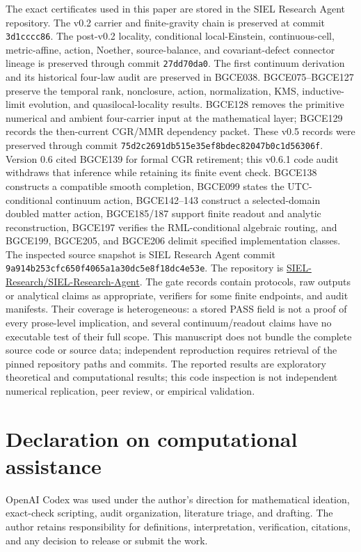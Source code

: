 \documentclass[11pt]{article}
\theoremstyle{definition}
\theoremstyle{remark}
\begin{document}
The exact certificates used in this paper are stored in the SIEL Research Agent repository. The v0.2 carrier and finite-gravity chain is preserved at commit \texttt{3d1cccc86}. The post-v0.2 locality, conditional local-Einstein, continuous-cell, metric-affine, action, Noether, source-balance, and covariant-defect connector lineage is preserved through commit \texttt{27dd70da0}. The first continuum derivation and its historical four-law audit are preserved in BGCE038. BGCE075--BGCE127 preserve the temporal rank, nonclosure, action, normalization, KMS, inductive-limit evolution, and quasilocal-locality results. BGCE128 removes the primitive numerical and ambient four-carrier input at the mathematical layer; BGCE129 records the then-current CGR/MMR dependency packet. These v0.5 records were preserved through commit \texttt{75d2c2691db515e35ef8bdec82047b0c1d56306f}. Version 0.6 cited BGCE139 for formal CGR retirement; this v0.6.1 code audit withdraws that inference while retaining its finite event check. BGCE138 constructs a compatible smooth completion, BGCE099 states the UTC-conditional continuum action, BGCE142--143 construct a selected-domain doubled matter action, BGCE185/187 support finite readout and analytic reconstruction, BGCE197 verifies the RML-conditional algebraic routing, and BGCE199, BGCE205, and BGCE206 delimit specified implementation classes. The inspected source snapshot is SIEL Research Agent commit \texttt{9a914b253cfc650f4065a1a30dc5e8f18dc4e53e}. The repository is
\href{https://github.com/SIEL-Research/SIEL-Research-Agent}{SIEL-Research/SIEL-Research-Agent}.
The gate records contain protocols, raw outputs or analytical claims as appropriate, verifiers for some finite endpoints, and audit manifests. Their coverage is heterogeneous: a stored PASS field is not a proof of every prose-level implication, and several continuum/readout claims have no executable test of their full scope. This manuscript does not bundle the complete source code or source data; independent reproduction requires retrieval of the pinned repository paths and commits. The reported results are exploratory theoretical and computational results; this code inspection is not independent numerical replication, peer review, or empirical validation.

\section*{Declaration on computational assistance}

OpenAI Codex was used under the author's direction for mathematical ideation, exact-check scripting, audit organization, literature triage, and drafting. The author retains responsibility for definitions, interpretation, verification, citations, and any decision to release or submit the work.
\end{document}
